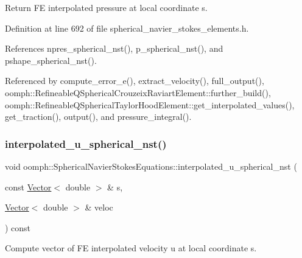 Return FE interpolated pressure at local coordinate s. 



Definition at line 692 of file spherical\+\_\+navier\+\_\+stokes\+\_\+elements.\+h.



References npres\+\_\+spherical\+\_\+nst(), p\+\_\+spherical\+\_\+nst(), and pshape\+\_\+spherical\+\_\+nst().



Referenced by compute\+\_\+error\+\_\+e(), extract\+\_\+velocity(), full\+\_\+output(), oomph\+::\+Refineable\+Q\+Spherical\+Crouzeix\+Raviart\+Element\+::further\+\_\+build(), oomph\+::\+Refineable\+Q\+Spherical\+Taylor\+Hood\+Element\+::get\+\_\+interpolated\+\_\+values(), get\+\_\+traction(), output(), and pressure\+\_\+integral().

\mbox{\label{classoomph_1_1SphericalNavierStokesEquations_af59a7941f1ac3c2b3bc9a8aacbfa4625}} 
\subsubsection{\texorpdfstring{interpolated\+\_\+u\+\_\+spherical\+\_\+nst()}{interpolated\_u\_spherical\_nst()}\hspace{0.1cm}{\footnotesize\ttfamily [1/2]}}
{\footnotesize\ttfamily void oomph\+::\+Spherical\+Navier\+Stokes\+Equations\+::interpolated\+\_\+u\+\_\+spherical\+\_\+nst (\begin{DoxyParamCaption}\item[{const \hyperlink{classoomph_1_1Vector}{Vector}$<$ double $>$ \&}]{s,  }\item[{\hyperlink{classoomph_1_1Vector}{Vector}$<$ double $>$ \&}]{veloc }\end{DoxyParamCaption}) const\hspace{0.3cm}{\ttfamily [inline]}}



Compute vector of FE interpolated velocity u at local coordinate s. 



